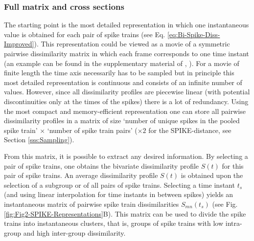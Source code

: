 \documentclass[10pt,twocolumn]{elsart5p}
\begin{document}
%

\subsubsection{\label{sss:Full-matrix-and-cross-sections} Full matrix and cross sections}

The starting point is the most detailed representation in which one instantaneous value is obtained for each pair of spike trains (see Eq. \ref{eq:Bi-Spike-Diss-Improved}). This representation could be viewed as a movie of a symmetric pairwise dissimilarity matrix in which each frame corresponds to one time instant (an example can be found in the supplementary material of \citeauthor{Kreuz13}, \citeyear{Kreuz13}). For a movie of finite length the time axis necessarily has to be sampled but in principle this most detailed representation is continuous and consists of an infinite number of values. However, since all dissimilarity profiles are piecewise linear (with potential discontinuities only at the times of the spikes) there is a lot of redundancy. Using the most compact and memory-efficient representation one can store all pairwise dissimilarity profiles in a matrix of size `number of unique spikes in the pooled spike train' $\times$ `number of spike train pairs' ($\times 2$ for the SPIKE-distance, see Section \ref{sss:Sampling}).

From this matrix, it is possible to extract any desired information. By selecting a pair of spike trains, one obtains the bivariate dissimilarity profile $S (t)$ for this pair of spike trains. An average dissimilarity profile $S (t)$ is obtained upon the selection of a subgroup or of all pairs of spike trains. Selecting a time instant $t_s$ (and using linear interpolation for time instants in between spikes) yields an instantaneous matrix of pairwise spike train dissimilarities $S_{mn}(t_s)$  (see Fig. \ref{fig:Fig2-SPIKE-Representations}B). This matrix can be used to divide the spike trains into instantaneous clusters, that is, groups of spike trains with low intra-group and high inter-group dissimilarity.
\end{document}
